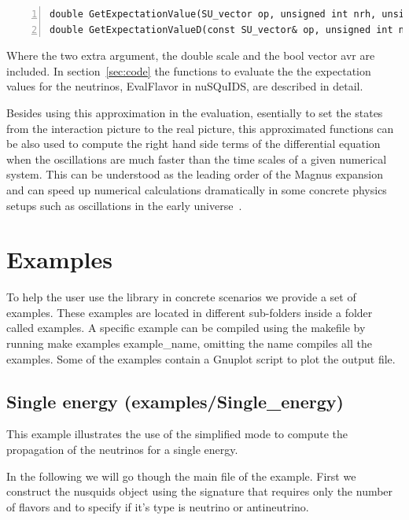 \documentclass[3p,12pt]{elsarticle}
\newcommand{\ttf}{\ttfamily}
\begin{document}
\begin{lstlisting}[frame=leftline, numbers = left,breaklines=true, label = ex:sin1,firstnumber=last]
double GetExpectationValue(SU_vector op, unsigned int nrh, unsigned int i, double scale, std::vector<bool>& avr) cons
double GetExpectationValueD(const SU_vector& op, unsigned int nrh, double x, double scale, std::vector<bool>& avr) const;
\end{lstlisting}

Where the two extra argument, the {\ttf double scale} and the {\ttf
  bool} vector {\ttf avr} are included.
In section~\ref{sec:code} the functions to evaluate the the expectation values for the neutrinos, {\ttf EvalFlavor} in
{\ttf nuSQuIDS}, are described in detail.  

Besides using this approximation in the evaluation, esentially to set the states
from the interaction picture to the real picture, this approximated functions can be also used to compute the right hand side
terms of the differential equation when the oscillations are much
faster than the time scales of a given numerical system. This can be
understood as the leading order of the Magnus expansion~\cite{Magnus:1954zz} and can
speed up numerical calculations dramatically in some concrete physics setups
such as oscillations in the early universe~\cite{Hernandez:2016kel}. 


\section{Examples}
\label{sec:examples}
To help the user use the library in concrete scenarios we provide
a set of examples. These examples are located in different sub-folders inside a folder
called {\ttf examples}. A specific example can be compiled using the
makefile by running {\ttf make examples example\_name}, omitting the
name compiles all the examples. 
Some of the examples contain a {\ttf Gnuplot} script to plot the output file.

\subsection{Single energy \textnormal{({\ttf examples/Single\_energy})}}
\label{sec:single}
This example illustrates the use of the simplified mode to compute the
propagation of the neutrinos for a single energy. 

In the following we will go though the main file of the example.
First we construct the nusquids object using the signature that
requires only the number of flavors and to specify if it's type is
neutrino or antineutrino.
\end{document}

